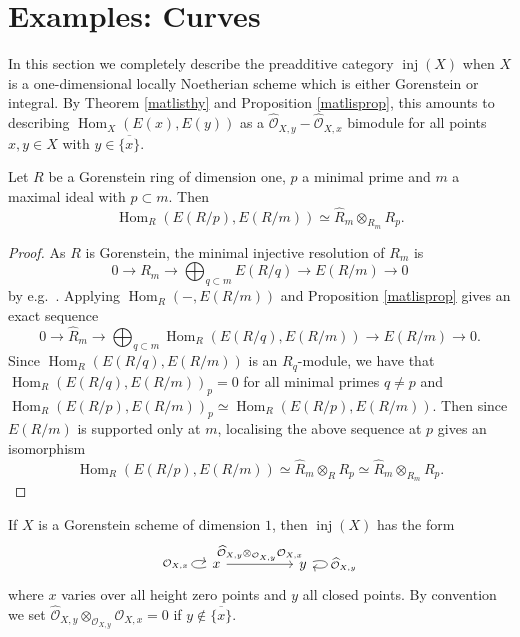 \documentclass[12pt,oneside]{amsart}
\DeclareMathOperator{\Hom}{Hom}
\DeclareMathOperator{\inj}{inj}
\begin{document}
\section{Examples: Curves} \label{curvessec}

In this section we completely describe the  preadditive category $\inj(X)$ when $X$ is a one-dimensional locally Noetherian scheme which is either Gorenstein or integral. By Theorem \ref{matlisthy} and Proposition \ref{matlisprop}, this amounts to describing $\Hom_X(E(x),E(y))$ as a $\widehat{\mathcal{O}}_{X,y}-\widehat{\mathcal{O}}_{X,x}$ bimodule for all points $x,y \in X$ with $y \in \overline{\{x\}}$.


\begin{lemma} \label{gorensteinhom}
Let $R$ be a Gorenstein ring of dimension one, $p$ a minimal prime and $m$ a maximal ideal with $p \subset m$. Then 
\[
\Hom_R(E(R/p),E(R/m)) \simeq \widehat{R}_m \otimes_{R_m}  R_p. 
\]
\end{lemma}

\begin{proof}
As $R$ is Gorenstein, the minimal injective resolution of $R_m$ is 
\[
0 \to R_m \to \bigoplus_{q \subset m} E(R/q) \to E(R/m) \to 0
\]
by e.g.\ \cite[Theorem 9.2.27]{EJ11}.
Applying $\Hom_R(-,E(R/m))$ and Proposition \ref{matlisprop} gives an exact sequence
\[
0 \to \widehat{R}_m \to \bigoplus_{q \subset m} \Hom_R(E(R/q),E(R/m)) \to E(R/m) \to 0.
\]
Since $\Hom_R(E(R/q),E(R/m))$ is an $R_q$-module, we have that $\Hom_R(E(R/q),E(R/m))_p = 0$ for all minimal primes $q \neq p$ and $\Hom_R(E(R/p),E(R/m))_p \simeq \Hom_R(E(R/p),E(R/m))$. Then since $E(R/m)$ is supported only at $m$, localising the above sequence at $p$ gives an isomorphism
\[
\Hom_R(E(R/p),E(R/m)) \simeq \widehat{R}_m \otimes_R R_p \simeq \widehat{R}_m \otimes_{R_m} R_p.
\]
\end{proof}


\begin{theorem} \label{gorensteineg}
If $X$ is a Gorenstein scheme of dimension $1$, then $\inj(X)$ has the form
\[
\begin{tikzcd}[column sep = huge]
x \arrow[r,"\widehat{\mathcal{O}}_{X,y} \otimes_{\mathcal{O}_{X,y}} \mathcal{O}_{X,x}"] \arrow[loop left,"\mathcal{O}_{X,x}"] & y \arrow[loop right, "\widehat{\mathcal{O}}_{X,y}"]
\end{tikzcd}
\]
where $x$ varies over all height zero points and $y$ all closed points. By convention we set $\widehat{\mathcal{O}}_{X,y} \otimes_{\mathcal{O}_{X,y}} \mathcal{O}_{X,x} = 0$ if $y \not \in \overline{\{x\}}$.
\end{theorem}
\end{document}
